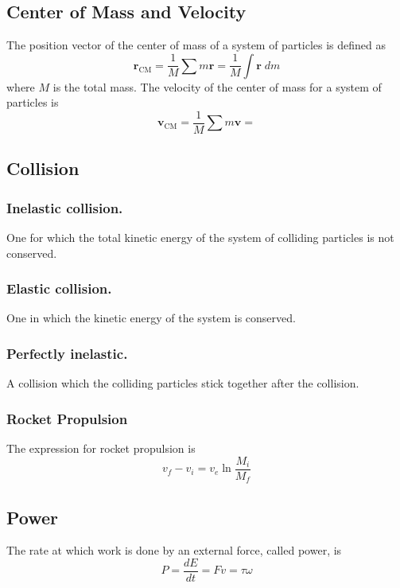 \documentclass[../../../main.tex]{subfiles}
\begin{document}
\subsection{Center of Mass and Velocity}
The position vector of the center of mass of a system of particles is defined as
\begin{equation*}
    \mathbf{r}_\text{CM}=\frac{1}{M}\sum m\mathbf{r}=\frac{1}{M}\int \mathbf{r}\;dm
\end{equation*}
where $M$ is the total mass. The velocity of the center of mass for a system of particles is
\begin{equation*}
    \mathbf{v}_\text{CM}=\frac{1}{M}\sum m\mathbf{v}=
\end{equation*}

\subsection{Collision}
\subsubsection{Inelastic collision.} One for which the total kinetic energy of the system of colliding particles is not conserved.

\subsubsection{Elastic collision.} One in which the kinetic energy of the
system is conserved.

\subsubsection{Perfectly inelastic.} A collision which the colliding particles stick together after the collision.

\subsubsection{Rocket Propulsion} The expression for rocket propulsion
is 
\begin{equation*}
    v_f-v_i=v_e\ln\frac{M_i}{M_f}
\end{equation*}

\subsection{Power}
The rate at which work is done by an external force, called power, is
\begin{equation*}
    P=\frac{dE}{dt}=Fv=\tau\omega
\end{equation*}
\end{document}
